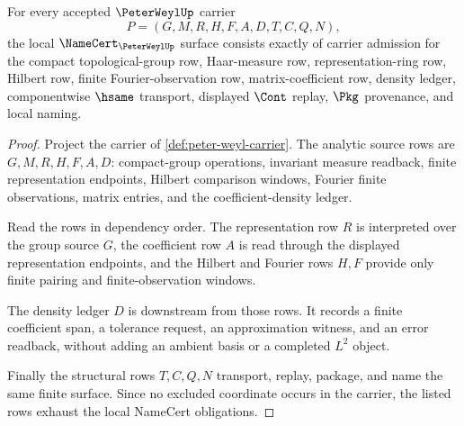 \begin{theorem}
\label{thm:peter-weyl-namecert-obligations}
For every accepted $\PeterWeylUp$ carrier
$$
P=(G,M,R,H,F,A,D,T,C,Q,N),
$$
the local $\NameCert_{\PeterWeylUp}$ surface consists exactly of carrier admission for the compact topological-group row, Haar-measure row, representation-ring row, Hilbert row, finite Fourier-observation row, matrix-coefficient row, density ledger, componentwise $\hsame$ transport, displayed $\Cont$ replay, $\Pkg$ provenance, and local naming.
\end{theorem}
\begin{proof}
Project the carrier of \autoref{def:peter-weyl-carrier}. The analytic source rows are $G,M,R,H,F,A,D$: compact-group operations, invariant measure readback, finite representation endpoints, Hilbert comparison windows, Fourier finite observations, matrix entries, and the coefficient-density ledger.

Read the rows in dependency order. The representation row $R$ is interpreted over the group source $G$, the coefficient row $A$ is read through the displayed representation endpoints, and the Hilbert and Fourier rows $H,F$ provide only finite pairing and finite-observation windows.

The density ledger $D$ is downstream from those rows. It records a finite coefficient span, a tolerance request, an approximation witness, and an error readback, without adding an ambient basis or a completed $L^2$ object.

Finally the structural rows $T,C,Q,N$ transport, replay, package, and name the same finite surface. Since no excluded coordinate occurs in the carrier, the listed rows exhaust the local NameCert obligations.
\end{proof}

